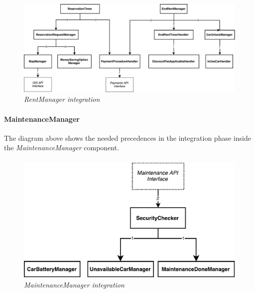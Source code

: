 \paragraph{}

		\begin{figure}[h]
			\centering
			\includegraphics[width=\linewidth]{img/rentManagerIntegration}
			\caption{
				\label{fig:rentManagerIntegration} 
				\emph{RentManager integration}
			}
		\end{figure}
		
\paragraph{MaintenanceManager} 
The diagram above shows the needed precedences in the integration phase inside the \emph{MaintenanceManager} component.
\paragraph{}

		\begin{figure}[h]
			\centering
			\includegraphics[width=\linewidth]{img/maintenanceIntegration}
			\caption{
				\label{fig:maintenanceIntegration} 
				\emph{MaintenanceManager integration}
			}
		\end{figure}
		
